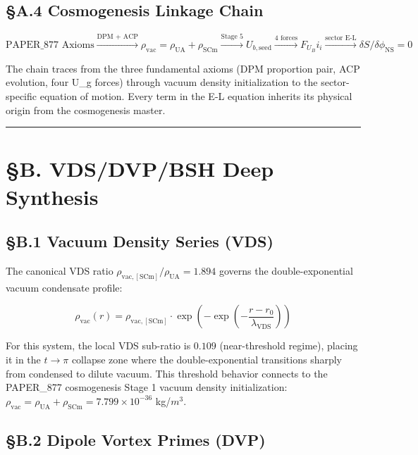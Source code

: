 \documentclass[12pt,a4paper]{article}
\begin{document}
\subsection{\S{}A.4 Cosmogenesis Linkage Chain}

\begin{equation}
\text{PAPER\_877 Axioms} \xrightarrow{\text{DPM + ACP}} \rho_{\mathrm{vac}} = \rho_{\mathrm{UA}} + \rho_{\mathrm{SCm}} \xrightarrow{\text{Stage 5}} U_{b,\mathrm{seed}} \xrightarrow{\text{4 forces}} F_U_Bi_i \xrightarrow{\text{sector E-L}} \delta S/\delta \phi_{\mathrm{NS}} = 0
\end{equation}

The chain traces from the three fundamental axioms (DPM proportion pair, ACP evolution, four U\_g forces) through vacuum density initialization to the sector-specific equation of motion. Every term in the E-L equation inherits its physical origin from the cosmogenesis master.

\medskip\hrule\medskip

\section{\S{}B. VDS/DVP/BSH Deep Synthesis}

\subsection{\S{}B.1 Vacuum Density Series (VDS)}

The canonical VDS ratio $\rho_{\mathrm{vac,[SCm]}} / \rho_{\mathrm{UA}} = 1.894$ governs the double-exponential vacuum condensate profile:

\begin{equation}
\rho_{\mathrm{vac}}(r) = \rho_{\mathrm{vac,[SCm]}} \cdot \exp\!\left(-\exp\!\left(-\frac{r - r_0}{\lambda_{\mathrm{VDS}}}\right)\right)
\end{equation}

For this system, the local VDS sub-ratio is $0.109$ (near-threshold regime), placing it in the $t \to \pi$ collapse zone where the double-exponential transitions sharply from condensed to dilute vacuum. This threshold behavior connects to the PAPER\_877 cosmogenesis Stage 1 vacuum density initialization: $\rho_{\mathrm{vac}} = \rho_{\mathrm{UA}} + \rho_{\mathrm{SCm}} = 7.799 \times 10^{-36}$ kg/$m^{3}$.

\subsection{\S{}B.2 Dipole Vortex Primes (DVP)}
\end{document}
